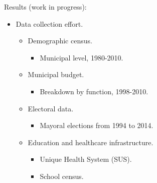 \documentclass[ignorenonframetext,]{beamer}
\providecommand{\tightlist}{%
  \setlength{\itemsep}{0pt}\setlength{\parskip}{0pt}}
\begin{document}
\begin{frame}{Results (work in progress):}

\begin{itemize}[<+->]
\tightlist
\item
  Data collection effort.

  \begin{itemize}[<+->]
  \tightlist
  \item
    Demographic census.

    \begin{itemize}[<+->]
    \tightlist
    \item
      Municipal level, 1980-2010.
    \end{itemize}
  \item
    Municipal budget.

    \begin{itemize}[<+->]
    \tightlist
    \item
      Breakdown by function, 1998-2010.
    \end{itemize}
  \item
    Electoral data.

    \begin{itemize}[<+->]
    \tightlist
    \item
      Mayoral elections from 1994 to 2014.
    \end{itemize}
  \item
    Education and healthcare infrastructure.

    \begin{itemize}[<+->]
    \tightlist
    \item
      Unique Health System (SUS).
    \item
      School census.
    \end{itemize}
  \end{itemize}
\end{itemize}

\end{frame}
\end{document}
